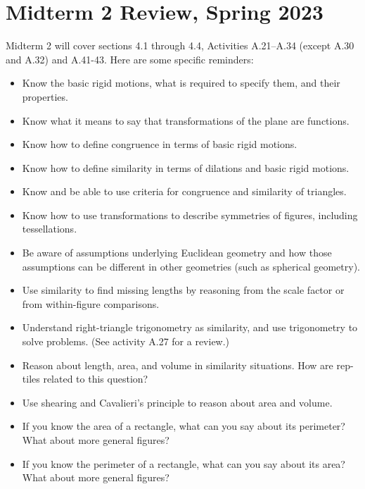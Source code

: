 \newpage

\section{Midterm 2 Review, Spring 2023}


Midterm 2 will cover sections 4.1 through 4.4, Activities A.21--A.34 (except A.30 and A.32) and A.41-43. Here are some specific reminders:
\begin{itemize}\itemsep-3pt
\item Know the basic rigid motions, what is required to specify them, and their properties. 
\item Know what it means to say that transformations of the plane are functions.  
\item Know how to define congruence in terms of basic rigid motions. 
\item Know how to define similarity in terms of dilations and basic rigid motions.  
\item Know and be able to use criteria for congruence and similarity of triangles.  
\item Know how to use transformations  to describe symmetries of figures, including tessellations.  
\item Be aware of assumptions underlying Euclidean geometry and how those assumptions can be different in other geometries (such as spherical geometry).  
\item Use similarity to find missing lengths by reasoning from the scale factor or from within-figure comparisons.   
\item Understand right-triangle trigonometry as similarity, and use trigonometry to solve problems.  (See activity A.27 for a review.)
\item Reason about length, area, and volume in similarity situations.  How are rep-tiles related to this question?  
\item Use shearing and Cavalieri's principle to reason about area and volume.  
\item If you know the area of a rectangle, what can you say about its perimeter?  What about more general figures?  
\item If you know the perimeter of a rectangle, what can you say about its area?  What about more general figures? 
\end{itemize}


